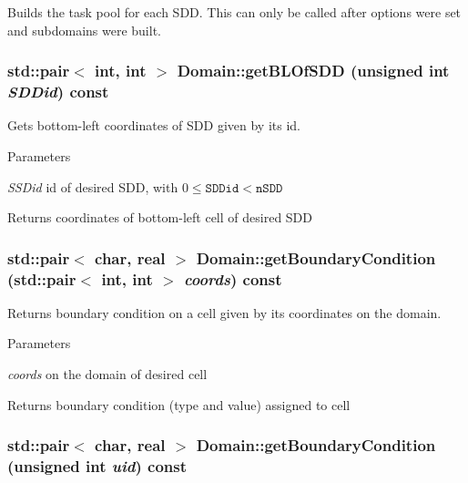 Builds the task pool for each SDD. This can only be called after options were set and subdomains were built. \hypertarget{classDomain_ab304fc5121bd34e817526fd2d4ccaa62}{
\subsubsection[{getBLOfSDD}]{\setlength{\rightskip}{0pt plus 5cm}std::pair$<$ int, int $>$ Domain::getBLOfSDD (unsigned int {\em SDDid}) const}}
\label{classDomain_ab304fc5121bd34e817526fd2d4ccaa62}


Gets bottom-\/left coordinates of SDD given by its id. 
\begin{DoxyParams}{Parameters}
\item[{\em SSDid}]id of desired SDD, with $0 \leq \texttt{SDDid} < \texttt{nSDD}$\end{DoxyParams}
\begin{DoxyReturn}{Returns}
coordinates of bottom-\/left cell of desired SDD 
\end{DoxyReturn}
\hypertarget{classDomain_a7c1da36a59bd95dd5f7c91365f2372bd}{
\subsubsection[{getBoundaryCondition}]{\setlength{\rightskip}{0pt plus 5cm}std::pair$<$ char, real $>$ Domain::getBoundaryCondition (std::pair$<$ int, int $>$ {\em coords}) const}}
\label{classDomain_a7c1da36a59bd95dd5f7c91365f2372bd}


Returns boundary condition on a cell given by its coordinates on the domain. 
\begin{DoxyParams}{Parameters}
\item[{\em coords}]on the domain of desired cell\end{DoxyParams}
\begin{DoxyReturn}{Returns}
boundary condition (type and value) assigned to cell 
\end{DoxyReturn}
\hypertarget{classDomain_af320a2bc1abbef2f8f7d7f768799194f}{
\subsubsection[{getBoundaryCondition}]{\setlength{\rightskip}{0pt plus 5cm}std::pair$<$ char, real $>$ Domain::getBoundaryCondition (unsigned int {\em uid}) const}}
\label{classDomain_af320a2bc1abbef2f8f7d7f768799194f}


